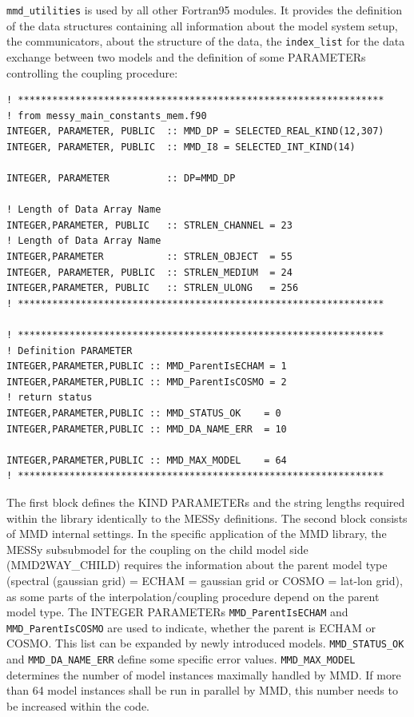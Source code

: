 \documentclass[twoside]{article}
\begin{document}
\verb|mmd_utilities| is used by all other Fortran95 modules. It provides the 
definition of the data structures containing all information about
the model system setup, the communicators, about the structure of the data, 
 the \verb|index_list| for the data exchange between two models and
 the definition of some {\footnotesize PARAMETER}s controlling the coupling
 procedure:
\begin{verbatim}
! ****************************************************************
! from messy_main_constants_mem.f90
INTEGER, PARAMETER, PUBLIC  :: MMD_DP = SELECTED_REAL_KIND(12,307)
INTEGER, PARAMETER, PUBLIC  :: MMD_I8 = SELECTED_INT_KIND(14)

INTEGER, PARAMETER          :: DP=MMD_DP

! Length of Data Array Name 
INTEGER,PARAMETER, PUBLIC   :: STRLEN_CHANNEL = 23     
! Length of Data Array Name
INTEGER,PARAMETER           :: STRLEN_OBJECT  = 55     
INTEGER, PARAMETER, PUBLIC  :: STRLEN_MEDIUM  = 24
INTEGER,PARAMETER, PUBLIC   :: STRLEN_ULONG   = 256
! ****************************************************************

! ****************************************************************
! Definition PARAMETER
INTEGER,PARAMETER,PUBLIC :: MMD_ParentIsECHAM = 1
INTEGER,PARAMETER,PUBLIC :: MMD_ParentIsCOSMO = 2
! return status
INTEGER,PARAMETER,PUBLIC :: MMD_STATUS_OK    = 0
INTEGER,PARAMETER,PUBLIC :: MMD_DA_NAME_ERR  = 10

INTEGER,PARAMETER,PUBLIC :: MMD_MAX_MODEL    = 64
! ****************************************************************
\end{verbatim}


The first block defines the  {\footnotesize KIND PARAMETERs}
 and the string lengths required
within the library identically to the MESSy definitions. The second block 
consists of MMD internal settings.
In the specific application of the MMD library, the 
MESSy subsubmodel for the coupling on the child model side (MMD2WAY\_CHILD)
 requires 
 the information about the parent model type (spectral (gaussian grid) =
 ECHAM = gaussian grid or COSMO = lat-lon grid), as some parts of the
 interpolation/coupling procedure depend on the parent model type.
The {\footnotesize INTEGER PARAMETERs} \verb|MMD_ParentIsECHAM| and 
\verb|MMD_ParentIsCOSMO|
are used to indicate, whether the parent is ECHAM or COSMO. This list can be
expanded by newly introduced models.  \verb|MMD_STATUS_OK|
and \verb|MMD_DA_NAME_ERR| define some specific error values. 
\verb|MMD_MAX_MODEL| determines the number of model instances maximally
handled by MMD.  
If more than 64 model instances shall be run in parallel by MMD, this number needs to be 
increased within the code. 
\end{document}
